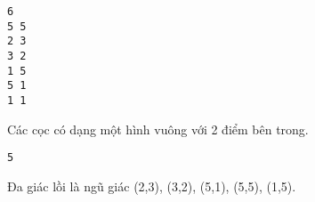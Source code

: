 \begin{verbatim}
6
5 5
2 3
3 2
1 5
5 1
1 1
\end{verbatim}
Các cọc có dạng một hình vuông với 2 điểm bên trong.
\begin{verbatim}
5
\end{verbatim}
Đa giác lồi là ngũ giác (2,3), (3,2), (5,1), (5,5), (1,5).